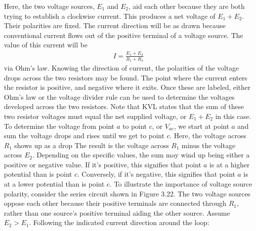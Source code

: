 \documentclass{report}
\begin{document}
\begin{itemize}
            \bigbreak \noindent 
            \bigbreak \noindent 
            Here, the two voltage sources, $E_{1}$ and $E_{2}$, aid each other because they are both trying to establish a clockwise current. This produces a net voltage of $E_{1}+E_{2}$. Their polarities are fixed. The current direction will be as drawn because conventional current flows out of the positive terminal of a voltage source. The value of this current will be 
            \begin{align*}
                I = \frac{E_{1} + E_{2}}{R_{1} + R_{2}}
            \end{align*}
            via Ohm's law.
            \bigbreak \noindent 
            Knowing the direction of current, the polarities of the voltage drops across the two resistors may be found. The point where the current enters the resistor is positive, and negative where it exits. Once these are labeled, either Ohm's law or the voltage divider rule can be used to determine the voltages developed across the two resistors. Note that KVL states that the sum of these two resistor voltages must equal the net supplied voltage, or $E_{1}+E_{2}$ in this case.
            \bigbreak \noindent 
            To determine the voltage from point $a$ to point $c$, or $V_{ac}$, we start at point $a$ and sum the voltage drops and rises until we get to point $c$. Here, the voltage across $R_{1}$ shows up as a drop
            \bigbreak \noindent 
            The result is the voltage across $R_{1}$ minus the voltage across $E_{2}$.
            \bigbreak \noindent 
            Depending on the specific values, the sum may wind up being either a positive or negative value. If it's positive, this signifies that point $a$ is at a higher potential than is point $c$. Conversely, if it's negative, this signifies that point $a$ is at a lower potential than is point $c$.
            \bigbreak \noindent 
            To illustrate the importance of voltage source polarity, consider the series circuit shown in Figure 3.22.
            \bigbreak \noindent 
            \bigbreak \noindent 
            The two voltage sources oppose each other because their positive terminals are connected through \(R_1\), rather than one source’s positive terminal aiding the other source.
            \bigbreak \noindent 
            Assume $E_{2} > E_{1}$. 
            \bigbreak \noindent 
            Following the indicated current direction around the loop:
            \begin{itemize}

\end{itemize}
\end{itemize}
\end{document}
